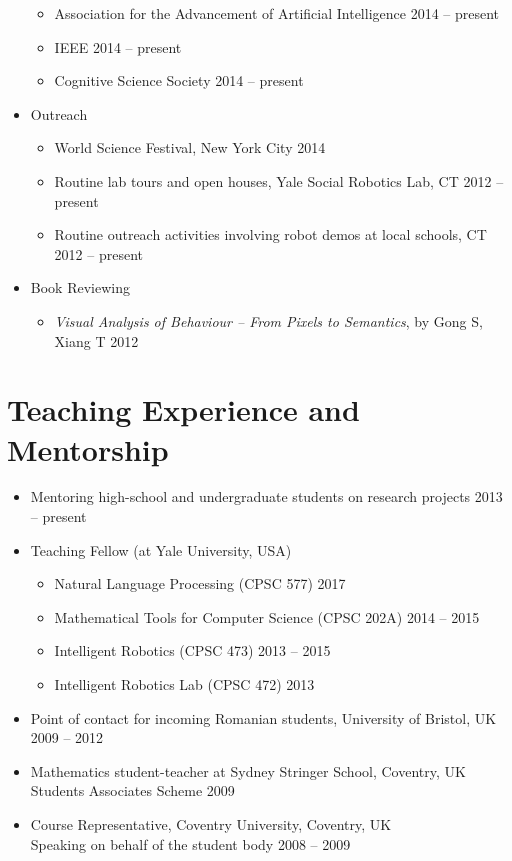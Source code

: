 \documentclass[10pt,letterpaper]{article}
\newcommand{\thing}[2]{{#1} \hfill {#2}}
\begin{document}
\begin{itemize}
\begin{itemize}
	\item\thing{ Association for the Advancement of Artificial Intelligence}{2014 -- present}
	\item \thing{IEEE}{2014 -- present}
	\item \thing{Cognitive Science Society}{2014 -- present}
	\end{itemize}
\item Outreach
	\begin{itemize}
	\item \thing{World Science Festival, New York City}{2014}
	\item \thing{Routine lab tours and open houses, Yale Social Robotics Lab, CT}{2012 -- present}
	\item \thing{Routine outreach activities involving robot demos at local schools, CT}{2012 -- present}
	\end{itemize}
\item Book Reviewing
	\begin{itemize}
	\item \thing{{\it Visual Analysis of Behaviour -- From Pixels to Semantics}, by Gong S, Xiang T}{2012}
	\end{itemize}
\end{itemize}

\section{Teaching Experience and Mentorship}
\begin{itemize}\setlength\itemsep{0em}
\item \thing{Mentoring high-school and undergraduate students on research projects}{2013 -- present}
\item Teaching Fellow (at Yale University, USA)
	\begin{itemize}\setlength\itemsep{0em}
	\item \thing{Natural Language Processing (CPSC 577)}{2017}
	\item \thing{Mathematical Tools for Computer Science (CPSC 202A)}{2014 -- 2015}
	\item \thing{Intelligent Robotics (CPSC 473)}{2013 -- 2015}
	\item \thing{Intelligent Robotics Lab (CPSC 472)}{2013}
	\end{itemize}
\item \thing{Point of contact for incoming Romanian students, University of Bristol, UK}{2009 -- 2012}
\item \thing{Mathematics student-teacher at Sydney Stringer School, Coventry, UK\\Students Associates Scheme}{2009}
\item \thing{Course Representative, Coventry University, Coventry, UK\\Speaking on behalf of the student body}{2008 -- 2009}
\end{itemize}
\end{document}
